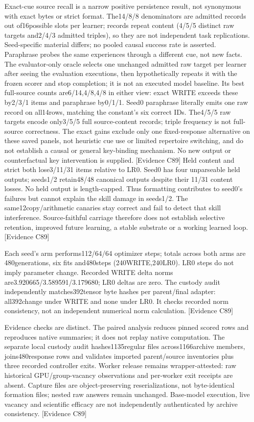 \documentclass[11pt]{article}
\begin{document}
Exact-cue source recall is a narrow positive persistence result, not synonymous
with exact bytes or strict format. The14/8/8 denominators are admitted records
out of16possible slots per learner; records repeat content (4/5/5 distinct raw
targets and2/4/3 admitted triples), so they are not independent task replications.
Seed-specific material differs; no pooled causal success rate is asserted.
Paraphrase probes the same experiences through a different cue, not new facts.
The evaluator-only oracle selects one unchanged admitted raw target per learner
after seeing the evaluation executions, then hypothetically repeats it with the
frozen scorer and stop completion; it is not an executed model baseline. Its best
full-source counts are6/14,4/8,4/8 in either view: exact WRITE exceeds these
by2/3/1 items and paraphrase by0/1/1. Seed0 paraphrase literally emits one raw
record on all14rows, matching the constant's six correct IDs. The4/5/5 raw
targets encode only3/5/5 full source-content records; triple frequency is not
full-source correctness. The exact gains exclude only one fixed-response
alternative on these saved panels, not heuristic cue use or limited repertoire
switching, and do not establish a causal or general key-binding mechanism.
No new output or counterfactual key intervention is supplied. \textsf{[Evidence C89]}
Held content and strict both lose3/11/31 items relative to LR0. Seed0 has four
unparseable held outputs; seeds1/2 retain48/48 canonical outputs despite their
11/31 content losses. No held output is length-capped. Thus formatting contributes
to seed0's failures but cannot explain the skill damage in seeds1/2.
The same12copy/arithmetic canaries stay correct and fail to detect that skill
interference. Source-faithful carriage therefore does not establish selective
retention, improved future learning, a stable substrate or a working learned loop.
\textsf{[Evidence C89]}

Each seed's arm performs112/64/64 optimizer steps; totals across both arms are
480generations, six fits and480steps (240WRITE,240LR0). LR0 steps do not imply
parameter change. Recorded WRITE delta norms are3.920665/3.589591/3.179680;
LR0 deltas are zero. The custody audit independently matches392tensor byte hashes
per parent/final adapter: all392change under WRITE and none under LR0. It checks
recorded norm consistency, not an independent numerical norm calculation.
\textsf{[Evidence C89]}

Evidence checks are distinct. The paired analysis reduces pinned scored rows
and reproduces native summaries; it does not replay native computation. The
separate local custody audit hashes1135regular files across1166archive members,
joins480response rows and validates imported parent/source inventories plus
three recorded controller exits. Worker release remains wrapper-attested:
raw historical GPU/group-vacancy observations and per-worker exit receipts are
absent. Capture files are object-preserving reserializations, not byte-identical
formation files; nested raw answers remain unchanged. Base-model execution,
live vacancy and scientific efficacy are not independently authenticated by
archive consistency. \textsf{[Evidence C89]}
\end{document}
